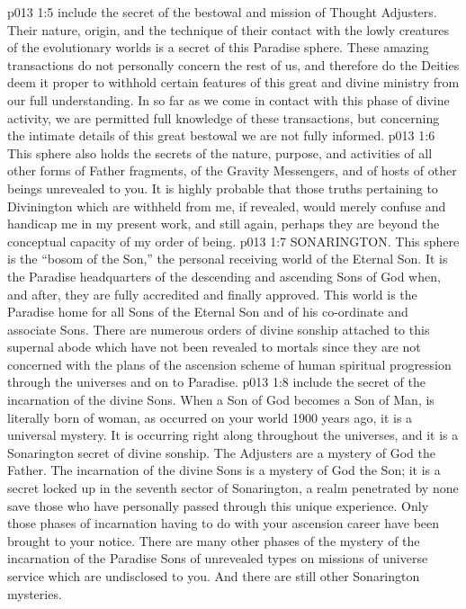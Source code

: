 \vs p013 1:5 \pc {} include the secret of the bestowal and mission of Thought Adjusters. Their nature, origin, and the technique of their contact with the lowly creatures of the evolutionary worlds is a secret of this Paradise sphere. These amazing transactions do not personally concern the rest of us, and therefore do the Deities deem it proper to withhold certain features of this great and divine ministry from our full understanding. In so far as we come in contact with this phase of divine activity, we are permitted full knowledge of these transactions, but concerning the intimate details of this great bestowal we are not fully informed.
\vs p013 1:6 This sphere also holds the secrets of the nature, purpose, and activities of all other forms of Father fragments, of the Gravity Messengers, and of hosts of other beings unrevealed to you. It is highly probable that those truths pertaining to Divinington which are withheld from me, if revealed, would merely confuse and handicap me in my present work, and still again, perhaps they are beyond the conceptual capacity of my order of being.
\vs p013 1:7 \bibnobreakspace SONARINGTON. This sphere is the “bosom of the Son,” the personal receiving world of the Eternal Son. It is the Paradise headquarters of the descending and ascending Sons of God when, and after, they are fully accredited and finally approved. This world is the Paradise home for all Sons of the Eternal Son and of his co\hyp{}ordinate and associate Sons. There are numerous orders of divine sonship attached to this supernal abode which have not been revealed to mortals since they are not concerned with the plans of the ascension scheme of human spiritual progression through the universes and on to Paradise.
\vs p013 1:8 \pc {} include the secret of the incarnation of the divine Sons. When a Son of God becomes a Son of Man, is literally born of woman, as occurred on your world 1900 years ago, it is a universal mystery. It is occurring right along throughout the universes, and it is a Sonarington secret of divine sonship. The Adjusters are a mystery of God the Father. The incarnation of the divine Sons is a mystery of God the Son; it is a secret locked up in the seventh sector of Sonarington, a realm penetrated by none save those who have personally passed through this unique experience. Only those phases of incarnation having to do with your ascension career have been brought to your notice. There are many other phases of the mystery of the incarnation of the Paradise Sons of unrevealed types on missions of universe service which are undisclosed to you. And there are still other Sonarington mysteries.
